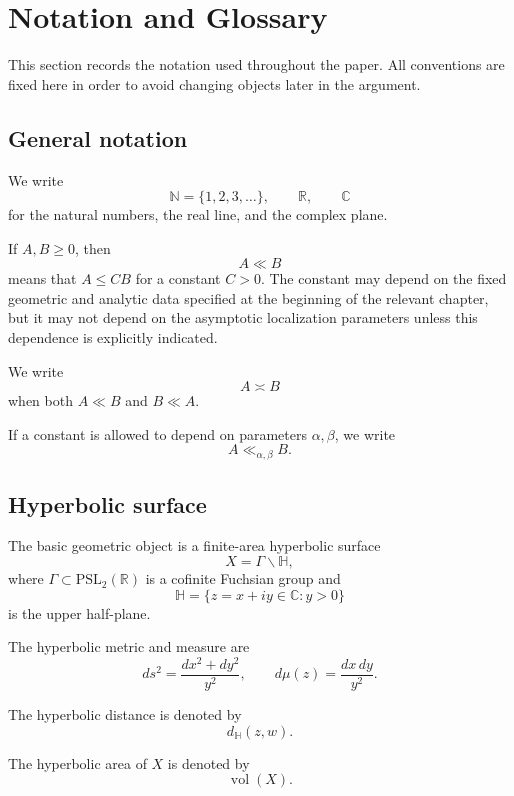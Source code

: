 
\chapter*{Notation and Glossary}

This section records the notation used throughout the paper.  All conventions are fixed here in order to avoid changing objects later in the argument.

\section*{General notation}

We write
\[
  \mathbb N=\{1,2,3,\ldots\},\qquad
  \mathbb R,\qquad
  \mathbb C
\]
for the natural numbers, the real line, and the complex plane.

If \(A,B\ge0\), then
\[
  A\ll B
\]
means that \(A\le CB\) for a constant \(C>0\).  The constant may depend on the fixed geometric and analytic data specified at the beginning of the relevant chapter, but it may not depend on the asymptotic localization parameters unless this dependence is explicitly indicated.

We write
\[
  A\asymp B
\]
when both \(A\ll B\) and \(B\ll A\).

If a constant is allowed to depend on parameters \(\alpha,\beta\), we write
\[
  A\ll_{\alpha,\beta}B.
\]

\section*{Hyperbolic surface}

The basic geometric object is a finite-area hyperbolic surface
\[
  X=\Gamma\backslash\mathbb H,
\]
where \(\Gamma\subset \mathrm{PSL}_2(\mathbb R)\) is a cofinite Fuchsian group and
\[
  \mathbb H=\{z=x+iy\in\mathbb C:y>0\}
\]
is the upper half-plane.

The hyperbolic metric and measure are
\[
  ds^2=\frac{dx^2+dy^2}{y^2},
  \qquad
  d\mu(z)=\frac{dx\,dy}{y^2}.
\]

The hyperbolic distance is denoted by
\[
  d_{\mathbb H}(z,w).
\]

The hyperbolic area of \(X\) is denoted by
\[
  \operatorname{vol}(X).
\]

